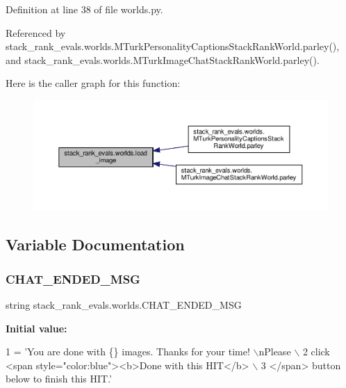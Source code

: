 Definition at line 38 of file worlds.\+py.



Referenced by stack\+\_\+rank\+\_\+evals.\+worlds.\+M\+Turk\+Personality\+Captions\+Stack\+Rank\+World.\+parley(), and stack\+\_\+rank\+\_\+evals.\+worlds.\+M\+Turk\+Image\+Chat\+Stack\+Rank\+World.\+parley().

Here is the caller graph for this function\+:
\nopagebreak
\begin{figure}[H]
\begin{center}
\leavevmode
\includegraphics[width=350pt]{namespacestack__rank__evals_1_1worlds_a0174c3e372a345f192cef824e4c5528d_icgraph}
\end{center}
\end{figure}


\subsection{Variable Documentation}
\mbox{\label{namespacestack__rank__evals_1_1worlds_adf99bb90bd705b460eb08bfdf5f1ccec}} 
\subsubsection{\texorpdfstring{C\+H\+A\+T\+\_\+\+E\+N\+D\+E\+D\+\_\+\+M\+SG}{CHAT\_ENDED\_MSG}}
{\footnotesize\ttfamily string stack\+\_\+rank\+\_\+evals.\+worlds.\+C\+H\+A\+T\+\_\+\+E\+N\+D\+E\+D\+\_\+\+M\+SG}

{\bfseries Initial value\+:}
\begin{DoxyCode}
1 =  \textcolor{stringliteral}{'You are done with \{\} images. Thanks for your time! \(\backslash\)nPlease \(\backslash\)}
2 \textcolor{stringliteral}{                  click <span style="color:blue"><b>Done with this HIT</b> \(\backslash\)}
3 \textcolor{stringliteral}{                  </span> button below to finish this HIT.'}
\end{DoxyCode}


